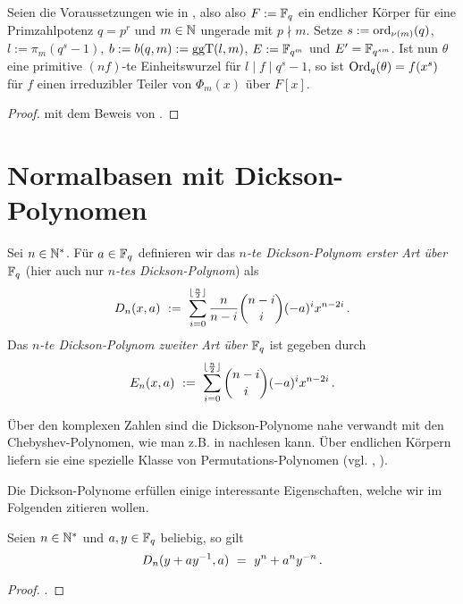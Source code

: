 \begin{lemma}
  \label{lemma:hoehere_wurzeln_auch_erzeuger_reg}
  Seien die Voraussetzungen wie in , also
  also $F := \mathbb{F}_q$ ein endlicher Körper für eine Primzahlpotenz $q = p^r$ 
  und $m\in\mathbb{N}$ ungerade mit $p\nmid m$.
  Setze $s := \operatorname{ord}_{\nu(m)}(q)$, 
  $l := \pi_m(q^s-1)$, $b:= b(q,m) := \operatorname{ggT}(l,m)$, $E := \mathbb{F}_{q^m}$ und
  $E' = \mathbb{F}_{q^{sm}}$. 
  Ist nun $\theta$ eine primitive $(nf)$-te Einheitswurzel für 
  $l \mid f \mid q^s-1$, so ist $\operatorname{Ord}_q(\theta) = f(x^s)$ für 
  $f$ einen irreduzibler Teiler von $\Phi_m(x)$ über $F[x]$.
\end{lemma}
\begin{proof}
   mit dem Beweis von
  .
\end{proof}


\section{Normalbasen mit Dickson-Polynomen}

\begin{definition}
  Sei $n \in \mathbb{N}^\ast$. Für $a \in \mathbb{F}_q$ definieren wir das
  \emph{$n$-te Dickson-Polynom erster Art über $\mathbb{F}_q$} 
  (hier auch nur \emph{$n$-tes Dickson-Polynom}) als
  \[ D_n(x,a) \ :=\  \sum_{i=0}^{\lfloor\frac n 2\rfloor} \frac{n}{n-i}
    \binom{n-i}{i} (-a)^i x^{n-2i}\,.\]
  Das \emph{$n$-te Dickson-Polynom zweiter Art über $\mathbb{F}_q$} ist gegeben durch
  \[ E_n(x,a) \ :=\  \sum_{i=0}^{\lfloor\frac n 2\rfloor} 
    \binom{n-i}{i} (-a)^i x^{n-2i}\,.\]
\end{definition}

\begin{bemerkung}
  Über den komplexen Zahlen sind die Dickson-Polynome 
  nahe verwandt mit den
  Chebyshev-Polynomen, wie man z.B. in \autocite[Absatz nach Corollary
  7.15]{lidl1997finite} nachlesen kann.
  Über endlichen Körpern liefern sie eine spezielle Klasse von
  Permutations-Polynomen (vgl. \autocite[Theorem 7.16]{lidl1997finite}, 
  \autocite[Section 9.6]{mullen2013handbook}).
\end{bemerkung}

Die Dickson-Polynome erfüllen einige interessante Eigenschaften, 
welche wir im Folgenden zitieren wollen.

\begin{proposition}
  \label{satz:dickson_1}
   Seien $n\in \mathbb{N}^\ast$ und $a,y\in \mathbb{F}_q$ beliebig, so gilt
  \[ D_n(y+ay^{-1}, a) \ =\  y^n +a^ny^{-n}\,.\]
\end{proposition}
\begin{proof}
  \autocite[Gleichung (7.8)]{lidl1997finite}.
\end{proof}

